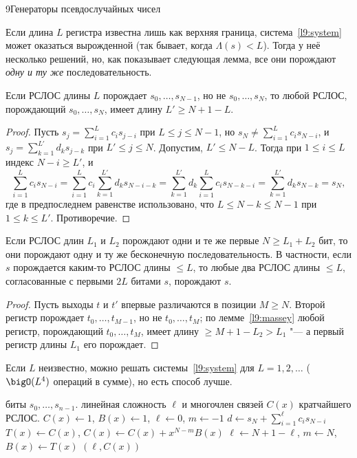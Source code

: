 \begin{lecture}{9}{Генераторы псевдослучайных чисел}

Если длина $L$ регистра известна лишь как верхняя граница, система~\eqref{l9:system} может
оказаться вырожденной (так бывает, когда $\Lambda(s) < L$). Тогда у неё несколько решений, но,
как показывает следующая лемма, все они порождают \emph{одну и ту же} последовательность.

\begin{lemma}\label{l9:massey}
Если РСЛОС длины $L$ порождает $s_0, \dots, s_{N-1}$, но не $s_0, \dots, s_N$, то любой РСЛОС,
порождающий $s_0, \dots, s_N$, имеет длину $L' \ge N + 1 - L$.
\end{lemma}

\begin{proof}
Пусть $s_j = \sum_{i=1}^{L} c_i s_{j-i}$ при $L \le j \le N - 1$, но
$s_N \ne \sum_{i=1}^{L} c_i s_{N-i}$, и $s_j = \sum_{k=1}^{L'} d_k s_{j-k}$ при $L' \le j \le N$.
Допустим, $L' \le N - L$. Тогда при $1 \le i \le L$ индекс $N - i \ge L'$, и
\[
  \sum_{i=1}^{L} c_i s_{N-i} = \sum_{i=1}^{L} c_i \sum_{k=1}^{L'} d_k s_{N-i-k}
  = \sum_{k=1}^{L'} d_k \sum_{i=1}^{L} c_i s_{N-k-i} = \sum_{k=1}^{L'} d_k s_{N-k} = s_N,
\]
где в предпоследнем равенстве использовано, что $L \le N - k \le N - 1$ при $1 \le k \le L'$.
Противоречие.
\end{proof}

\begin{corollary}\label{l9:unique}
Если РСЛОС длин $L_1$ и $L_2$ порождают одни и те же первые $N \ge L_1 + L_2$ бит, то они
порождают одну и ту же бесконечную последовательность. В частности, если $s$ порождается
каким-то РСЛОС длины $\le L$, то любые два РСЛОС длины $\le L$, согласованные с первыми $2L$ битами
$s$, порождают $s$.
\end{corollary}

\begin{proof}
Пусть выходы $t$ и $t'$ впервые различаются в позиции $M \ge N$. Второй регистр порождает
$t_0, \dots, t_{M-1}$, но не $t_0, \dots, t_M$; по лемме~\ref{l9:massey} любой регистр,
порождающий $t_0, \dots, t_M$, имеет длину $\ge M + 1 - L_2 > L_1$ "--- а первый регистр длины
$L_1$ его порождает.
\end{proof}

Если $L$ неизвестно, можно решать системы~\eqref{l9:system} для $L = 1, 2, \dots$ ($\bigO(L^4)$
операций в сумме), но есть способ лучше.

\begin{algorithm}
\begin{algorithmic}[1]
\Require биты $s_0, \dots, s_{n-1}$.
\Ensure линейная сложность $\ell$ и многочлен связей $C(x)$ кратчайшего РСЛОС.
\State $C(x) \gets 1$, $B(x) \gets 1$, $\ell \gets 0$, $m \gets -1$
  \State $d \gets s_N + \sum_{i=1}^{\ell} c_i s_{N-i}$ 
    \State $T(x) \gets C(x)$, \quad $C(x) \gets C(x) + x^{N - m} B(x)$
      \State $\ell \gets N + 1 - \ell$, \quad $m \gets N$, \quad $B(x) \gets T(x)$
    \EndIf
  \EndIf
\EndFor
\State \Return $(\ell, C(x))$
\end{algorithmic}
\end{algorithm}


\end{lecture}
